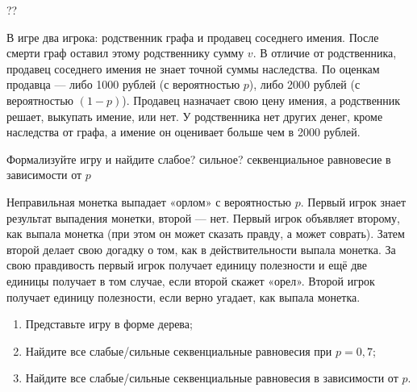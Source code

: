 \begin{problem}[Наследство]\par
\begin{source} \cite{slanthcev:gt}?? \end{source}
В игре два игрока: родственник графа и продавец соседнего имения. После смерти граф оставил этому родственнику сумму  $v$. В отличие от родственника, продавец соседнего имения не знает точной суммы наследства. По оценкам продавца — либо 1000 рублей (с вероятностью  $p$), либо 2000 рублей (с вероятностью  $\left(1-p\right)$). Продавец назначает свою цену имения, а родственник решает, выкупать имение, или нет. У родственника нет других денег, кроме наследства от графа, а имение он оценивает больше чем в 2000 рублей. \par
 Формализуйте игру и найдите {\red слабое? сильное? секвенциальное} равновесие в зависимости от  $p$\par



\begin{sol}

\end{sol}
\end{problem}






\begin{problem} 
 Неправильная монетка выпадает «орлом» с вероятностью  $p$. Первый игрок знает результат выпадения монетки, второй — нет. Первый игрок объявляет второму, как выпала монетка (при этом он может сказать правду, а может соврать). Затем второй делает свою догадку о том, как в действительности выпала монетка. За свою правдивость первый игрок получает единицу полезности и ещё две единицы получает в том случае, если второй скажет «орел». Второй игрок получает единицу полезности, если верно угадает, как выпала монетка.\par
 \begin{enumerate}
\item Представьте игру в форме дерева;\par
\item Найдите все слабые/сильные секвенциальные равновесия при $p=0,7$;\par
\item Найдите все слабые/сильные секвенциальные равновесия в зависимости от $p$.
\end{enumerate}


\begin{sol}

\end{sol}
\end{problem}




